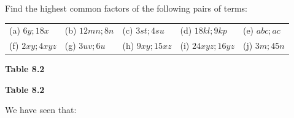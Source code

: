 \label{m39383*secfhsst!!!underscore!!!id565}
            \nopagebreak
          \label{m39383*id268887}Find the highest common factors of the
following pairs of terms:\par 
          \begin{table}[H]
        \begin{center}
      \label{m39383*id268893}
    \noindent
      \tablelasttail{}
      \begin{xtabular}[t]{|l|l|l|l|l|}\hline
        (a) $6y;18x$ &
        (b) $12mn;8n$ &
        (c) $3st;4su$ &
        (d) $18kl;9kp$ &
        (e) $abc;ac$%
     \tabularnewline{}
        (f) $2xy;4xyz$\hspace{5ex} &
        (g) $3uv;6u$ &
        (h) $9xy;15xz$\hspace{5ex} &
        (i) $24xyz;16yz$\hspace{5ex} &
        (j) $3m;45n$%
     \tabularnewline{}
    \end{xtabular}
      \end{center}
    \begin{center}{\small\bfseries Table 8.2}\end{center}
    \begin{caption}{\small\bfseries Table 8.2}\end{caption}
\end{table}
    \par
        \label{m39383*uid7}
            \nopagebreak
          \label{m39383*id269179}We have seen that:\par 
          \label{m39383*uid8}\nopagebreak\noindent{}
